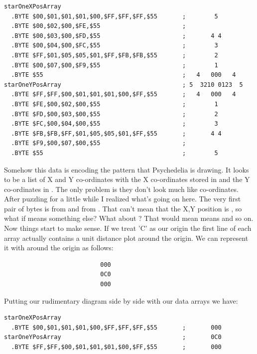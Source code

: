 \begin{lstlisting}[caption=Source code for the Star.]
starOneXPosArray  
  .BYTE $00,$01,$01,$01,$00,$FF,$FF,$FF,$55       ;        5       
  .BYTE $00,$02,$00,$FE,$55                       ;                
  .BYTE $00,$03,$00,$FD,$55                       ;       4 4      
  .BYTE $00,$04,$00,$FC,$55                       ;        3       
  .BYTE $FF,$01,$05,$05,$01,$FF,$FB,$FB,$55       ;        2       
  .BYTE $00,$07,$00,$F9,$55                       ;        1       
  .BYTE $55                                       ;   4   000   4  
starOneYPosArray                                  ; 5  3210 0123  5  
  .BYTE $FF,$FF,$00,$01,$01,$01,$00,$FF,$55       ;   4   000   4  
  .BYTE $FE,$00,$02,$00,$55                       ;        1       
  .BYTE $FD,$00,$03,$00,$55                       ;        2       
  .BYTE $FC,$00,$04,$00,$55                       ;        3       
  .BYTE $FB,$FB,$FF,$01,$05,$05,$01,$FF,$55       ;       4 4      
  .BYTE $F9,$00,$07,$00,$55                       ;                
  .BYTE $55                                       ;        5       
\end{lstlisting}

Somehow this data is encoding the pattern that Psychedelia is drawing. It looks to be a list of X and Y 
co-ordinates with the X co-ordinates stored in  and the Y co-ordinates in
. The only problem is they don't look much like co-ordinates. After puzzling 
for a little while I realized what's going on here. The very first pair of bytes is  from
 and  from . That can't mean that the X,Y
position is , so what if  means something else? What about ? That
would mean  means  and so on. Now things start to make sense. If we treat 'C' as our origin the first line of 
each array actually contains a unit distance plot around the origin. We can represent it with  around the origin as follows:

\begin{lstlisting}
                           000      
                           0C0        
                           000      
\end{lstlisting}

Putting our rudimentary diagram side by side with our data arrays we have:
\begin{lstlisting}
starOneXPosArray  
  .BYTE $00,$01,$01,$01,$00,$FF,$FF,$FF,$55       ;       000      
starOneYPosArray                                  ;       0C0        
  .BYTE $FF,$FF,$00,$01,$01,$01,$00,$FF,$55       ;       000      
\end{lstlisting}

